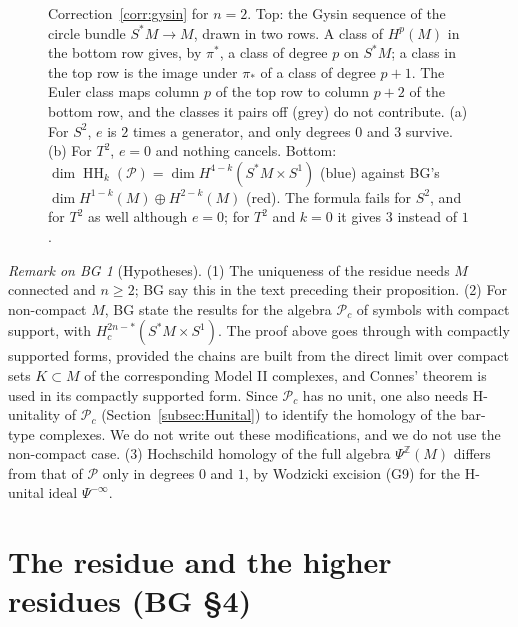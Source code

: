 \documentclass[11pt,oneside,reqno]{article}
\DeclareMathOperator{\HH}{HH}
\newcommand{\Z}{\mathbb Z}
\newcommand{\cP}{\mathcal P}
\theoremstyle{plain}
\theoremstyle{definition}
\theoremstyle{remark}
\newtheorem{bgremark}[theorem]{Remark on BG}
\begin{document}
\begin{figure}[htbp]
\caption[The Gysin sequence and BG's ``in particular'']{Correction~\ref{corr:gysin}
for \(n=2\). Top: the Gysin sequence of the circle bundle \(S^*M\to M\), drawn in
two rows. A class of \(H^p(M)\) in the bottom row gives, by \(\pi^*\), a class of
degree \(p\) on \(S^*M\); a class in the top row is the image under \(\pi_*\) of a
class of degree \(p+1\). The Euler class maps column \(p\) of the top row to column
\(p+2\) of the bottom row, and the classes it pairs off (grey) do not contribute. (a) For \(S^2\),
\(e\) is \(2\) times a generator, and only degrees \(0\) and \(3\) survive. (b) For \(T^2\),
\(e=0\) and nothing cancels. Bottom: \(\dim\HH_k(\cP)=\dim H^{4-k}(S^*M\times S^1)\)
(blue) against BG's \(\dim H^{1-k}(M)\oplus H^{2-k}(M)\) (red). The formula fails for
\(S^2\), and for \(T^2\) as well although \(e=0\); for \(T^2\) and \(k=0\) it gives
\(3\) instead of \(1\).}
\label{fig:gysin}
\end{figure}

\begin{bgremark}[Hypotheses]\label{rem:hyp}
(1) The uniqueness of the residue needs \(M\) connected and \(n\ge2\); BG say this in
the text preceding their proposition. (2) For non-compact \(M\), BG state the
results for the algebra \(\cP_c\) of symbols with compact support, with
\(H_c^{2n-*}(S^*M\times S^1)\). The proof above goes through with compactly supported
forms, provided the chains are built from the direct limit over compact sets
\(K\subset M\) of the corresponding Model II complexes, and Connes' theorem is used in
its compactly supported form. Since \(\cP_c\) has no unit, one also needs
H-unitality of \(\cP_c\) (Section~\ref{subsec:Hunital}) to identify the homology of
the bar-type complexes. We do not write out these modifications, and we do not
use the non-compact case. (3) Hochschild homology of the full algebra
\(\Psi^{\Z}(M)\) differs from that of \(\cP\) only in degrees \(0\) and \(1\), by Wodzicki
excision (G9) for the H-unital ideal \(\Psi^{-\infty}\).
\end{bgremark}

\section{The residue and the higher residues (BG \S4)}\label{sec:residue}
\end{document}
